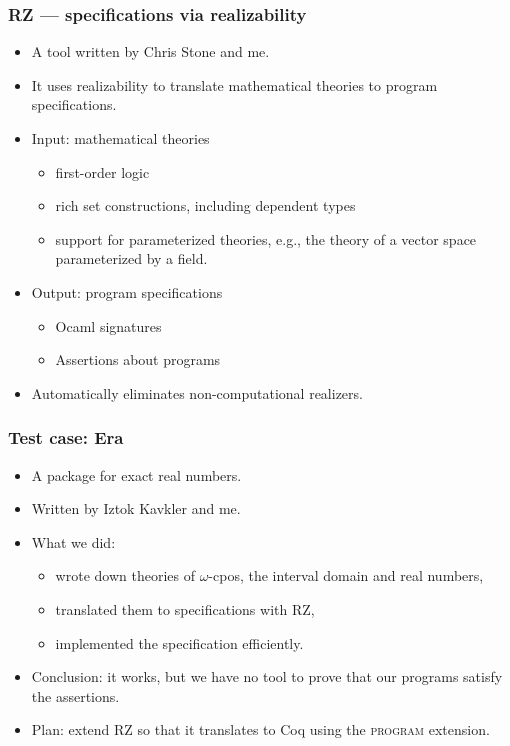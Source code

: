 \documentclass[t]{beamer}
\begin{document}
\begin{frame}
  \frametitle{RZ --- specifications via realizability}

  \begin{itemize}
  \item A tool written by Chris Stone and me.
  \item It uses realizability to translate mathematical theories to
    program specifications.
  \item Input: mathematical theories
    \begin{itemize}
    \item first-order logic
    \item rich set constructions, including dependent types
    \item support for parameterized theories, e.g., the theory of a
      vector space parameterized by a field.
    \end{itemize}
  \item Output: program specifications
    \begin{itemize}
    \item Ocaml signatures
    \item Assertions about programs
    \end{itemize}
  \item Automatically eliminates non-computational realizers.
  \end{itemize}
\end{frame}

\begin{frame}
  \frametitle{Test case: Era}

  \begin{itemize}
  \item A package for exact real numbers.
  \item Written by Iztok Kavkler and me.
  \item What we did:
    \begin{itemize}
    \item wrote down theories of $\omega$-cpos,
      the interval domain and real numbers,
    \item translated them to specifications with RZ,
    \item implemented the specification efficiently.
    \end{itemize}
  \item Conclusion: it works, but we have no tool to prove that our
    programs satisfy the assertions.
  \item Plan: extend RZ so that it translates to Coq using the
    \textsc{program} extension.
  \end{itemize}
\end{frame}
\end{document}
